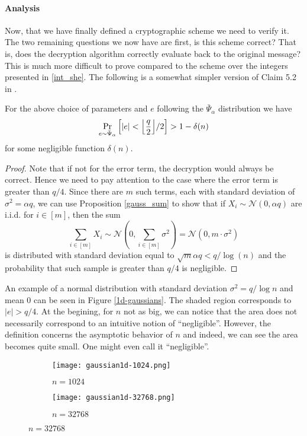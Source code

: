 \paragraph{Analysis}
Now, that we have finally defined a cryptographic scheme we need to verify it. The two remaining questions we now have are first, is this scheme correct? That is, does the decryption algorithm correctly evaluate back to the original message? This is much more difficult to prove compared to the scheme over the integers presented in \ref{int_she}. The following is a somewhat simpler version of Claim 5.2 in \cite{regev}.
\begin{lemma}[Correctness]
        For the above choice of parameters and $e$ following the $\bar{\Psi}_{\alpha}$ distribution we have
        \begin{equation} \Pr_{e \sim \bar{\Psi}_{\alpha}} \Big[ |e| < \Bigl \lfloor \frac{q}{2} \Bigr \rfloor /2 \Big] > 1 - \delta(n) \end{equation}
    for some negligible function $\delta(n)$.
\end{lemma}
\begin{proof}
        Note that if not for the error term, the decryption would always be correct. Hence we need to pay attention to the case where the error term is greater than $q/4$. Since there are $m$ such terms, each with standard deviation of $\sigma^2 = \alpha q$, we can use Proposition \ref{gauss_sum} to show that if $X_i \sim \mathcal{N}(0, \alpha q)$ are i.i.d. for $i \in [m]$, then the sum
        \[ \sum_{i \in [m]} X_i \sim \mathcal{N}(0, \sum_{i \in [m]} \sigma^2) = \mathcal{N}(0, m \cdot \sigma^2)\]
        is distributed with standard deviation equal to $\sqrt{m} \alpha q < q / \log(n)$ and the probability that such sample is greater than $q/4$ is negligible.
\end{proof}
An example of a normal distribution with standard deviation $\sigma^2 = q/\log n$ and mean 0 can be seen in Figure \ref{1d-gaussians}. The shaded region corresponds to $|e| > q/4$. At the begining, for $n$ not as big, we can notice that the area does not necessarily correspond to an intuitive notion of ``negligible''. However, the definition concerns the asymptotic behavior of $n$ and indeed, we can see the area becomes quite small. One might even call it ``negligible''.%

\begin{figure}
        \caption{1 dimensional Gaussian with standard deviation $\sigma^2 = q/\log n$ for:}
        \label{1d-gaussians}
        \centering
        \begin{subfigure}{.5\textwidth} 
                \centering
                \texttt{[image: gaussian1d-1024.png]}
                \caption{$n = 1024$}
        \end{subfigure}%
        \begin{subfigure}{.5\textwidth}
                \centering
                \texttt{[image: gaussian1d-32768.png]}
                \caption{$n = 32768$}
        \end{subfigure}
\end{figure}

